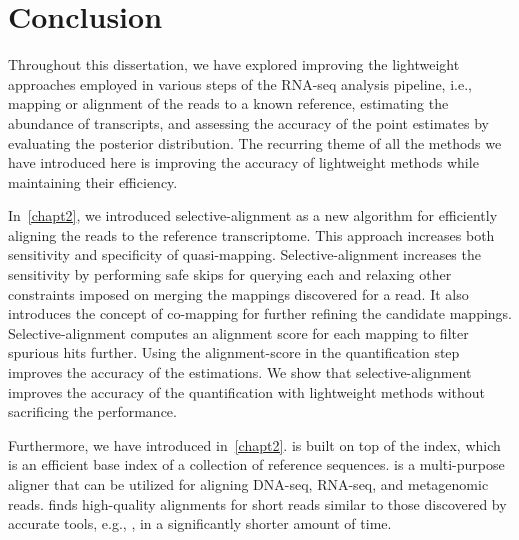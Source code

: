 
\renewcommand{\thechapter}{5}

\chapter[Conclusion]{Conclusion} 
\label{conclusion}

Throughout this dissertation, we have explored improving the lightweight approaches employed 
in various steps of the RNA-seq analysis pipeline, i.e., mapping or alignment of the reads to 
a known reference, estimating the abundance of transcripts, and assessing the accuracy of the 
point estimates by evaluating the posterior distribution.
The recurring theme of all the methods we have introduced here is improving the accuracy of 
lightweight methods while maintaining their efficiency.
 
In~\cref{chapt2}, we introduced selective-alignment as a new algorithm for efficiently
aligning the reads to the reference transcriptome. This approach increases both sensitivity
and specificity of quasi-mapping. Selective-alignment increases the sensitivity by performing
safe skips for querying each \kmer and relaxing other constraints
imposed on merging the mappings discovered for a read. It also introduces the concept of
co-mapping for further refining the candidate mappings. Selective-alignment computes
an alignment score for each mapping to filter spurious hits further. Using the alignment-score
in the quantification step improves the accuracy of the estimations.
We show that selective-alignment improves the accuracy of the quantification with lightweight
methods without sacrificing the performance.
 
Furthermore, we have introduced \puffaligner in~\cref{chapt2}. \puffaligner is built on top
of the \pufferfish index, which is an efficient \ccdbg base index of a collection of reference
sequences. \puffaligner is a multi-purpose aligner that can be utilized for aligning DNA-seq,
RNA-seq, and metagenomic reads. \puffaligner finds high-quality alignments for short reads 
similar to those discovered by accurate tools, e.g., \bt, in a significantly shorter amount
of time.
 
